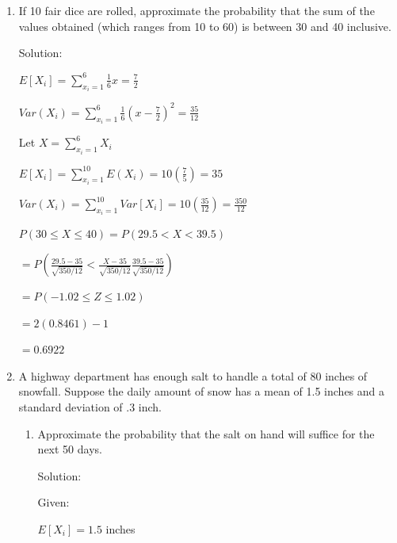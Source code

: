 \documentclass{article}
\begin{document}
\begin{enumerate}
\begin{enumerate}
        $\displaystyle E[X_3] = (0)(0.008) + (1/3)(0.036) + (2/3)(0.045) + (1)(0.087) + (4/3)(0.18) + (5/3)(0.135) + (7/3)(0.225) + (2)(0.15) + (3)(0.125)$

        $= 1.8$

        $\displaystyle Var(X_3) = [(0)^2(0.008)+(1/3)^2(0.036) + (2/3)^2(0.054) + (1)^2(0.087) + (4/3)^2(0.18) + (5/3)^2(0.135) + (2/3)^2(0.225)+ (2)^2(0.15) + (3)^2(0.126)] - (1.8)^2$

        $= 0.52$

    \end{enumerate}  
    \item If 10 fair dice are rolled, approximate the probability that the sum of the values obtained (which ranges from 10 to 60) is between 30 and 40 inclusive.
    
    Solution:

    $E[X_i] = \displaystyle \sum_{x_i = 1}^6 {\frac{1}{6}x = \frac{7}{2}}$

    $Var(X_i) = \displaystyle \sum_{x_i = 1}^6 {\frac{1}{6}{(x - \frac{7}{2})}^2 = \frac{35}{12}}$

    Let $X = \displaystyle \sum_{x_i = 1}^6 {X_i}$

    $E[X_i] = \displaystyle \sum_{x_i = 1}^{10} {E(X_i)} = 10(\frac{7}{5}) = 35$

    $Var(X_i) = \displaystyle \sum_{x_i = 1}^{10} {Var[X_i]} = 10(\frac{35}{12}) = \frac{350}{12}$

    $P(30 \leq X \leq 40) = P(29.5 < X < 39.5)$

    $= \displaystyle P\left(\frac{29.5 - 35}{\sqrt{350/12}}<\frac{X - 35}{\sqrt{350/12}}\frac{39.5 - 35}{\sqrt{350/12}}\right)$

    $= \displaystyle P\left(-1.02 \leq Z \leq 1.02 \right)$

    $= 2(0.8461)-1$

    $=0.6922$

    \item A highway department has enough salt to handle a total of 80 inches of snowfall. Suppose the daily amount of snow has a mean of 1.5 inches and a standard deviation of .3 inch.
    \begin{enumerate}
        \item Approximate the probability that the salt on hand will suffice for the next 50 days.
        
        Solution:
        
        Given:

        $E[X_i] = 1.5$ inches


\end{enumerate}
\end{enumerate}
\end{document}
